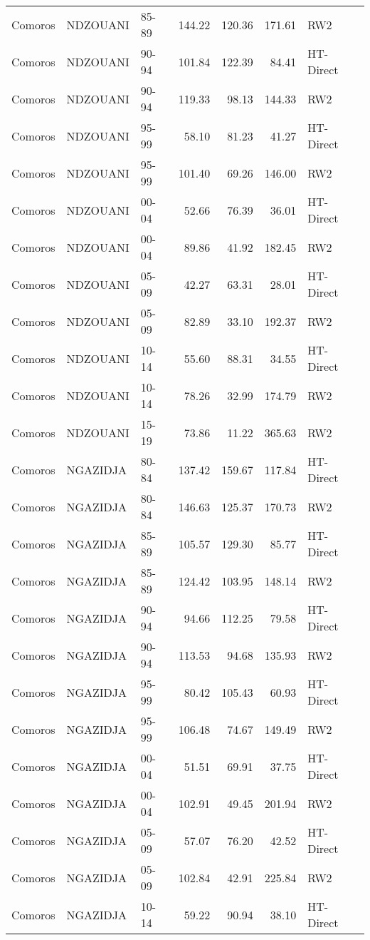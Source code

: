 \begin{longtable}{lllrrrl}
  Comoros & NDZOUANI & 85-89 & 144.22 & 120.36 & 171.61 & RW2 \\ 
  Comoros & NDZOUANI & 90-94 & 101.84 & 122.39 & 84.41 & HT-Direct \\ 
  Comoros & NDZOUANI & 90-94 & 119.33 & 98.13 & 144.33 & RW2 \\ 
  Comoros & NDZOUANI & 95-99 & 58.10 & 81.23 & 41.27 & HT-Direct \\ 
  Comoros & NDZOUANI & 95-99 & 101.40 & 69.26 & 146.00 & RW2 \\ 
  Comoros & NDZOUANI & 00-04 & 52.66 & 76.39 & 36.01 & HT-Direct \\ 
  Comoros & NDZOUANI & 00-04 & 89.86 & 41.92 & 182.45 & RW2 \\ 
  Comoros & NDZOUANI & 05-09 & 42.27 & 63.31 & 28.01 & HT-Direct \\ 
  Comoros & NDZOUANI & 05-09 & 82.89 & 33.10 & 192.37 & RW2 \\ 
  Comoros & NDZOUANI & 10-14 & 55.60 & 88.31 & 34.55 & HT-Direct \\ 
  Comoros & NDZOUANI & 10-14 & 78.26 & 32.99 & 174.79 & RW2 \\ 
  Comoros & NDZOUANI & 15-19 & 73.86 & 11.22 & 365.63 & RW2 \\ 
  Comoros & NGAZIDJA & 80-84 & 137.42 & 159.67 & 117.84 & HT-Direct \\ 
  Comoros & NGAZIDJA & 80-84 & 146.63 & 125.37 & 170.73 & RW2 \\ 
  Comoros & NGAZIDJA & 85-89 & 105.57 & 129.30 & 85.77 & HT-Direct \\ 
  Comoros & NGAZIDJA & 85-89 & 124.42 & 103.95 & 148.14 & RW2 \\ 
  Comoros & NGAZIDJA & 90-94 & 94.66 & 112.25 & 79.58 & HT-Direct \\ 
  Comoros & NGAZIDJA & 90-94 & 113.53 & 94.68 & 135.93 & RW2 \\ 
  Comoros & NGAZIDJA & 95-99 & 80.42 & 105.43 & 60.93 & HT-Direct \\ 
  Comoros & NGAZIDJA & 95-99 & 106.48 & 74.67 & 149.49 & RW2 \\ 
  Comoros & NGAZIDJA & 00-04 & 51.51 & 69.91 & 37.75 & HT-Direct \\ 
  Comoros & NGAZIDJA & 00-04 & 102.91 & 49.45 & 201.94 & RW2 \\ 
  Comoros & NGAZIDJA & 05-09 & 57.07 & 76.20 & 42.52 & HT-Direct \\ 
  Comoros & NGAZIDJA & 05-09 & 102.84 & 42.91 & 225.84 & RW2 \\ 
  Comoros & NGAZIDJA & 10-14 & 59.22 & 90.94 & 38.10 & HT-Direct \\ 

\end{longtable}
